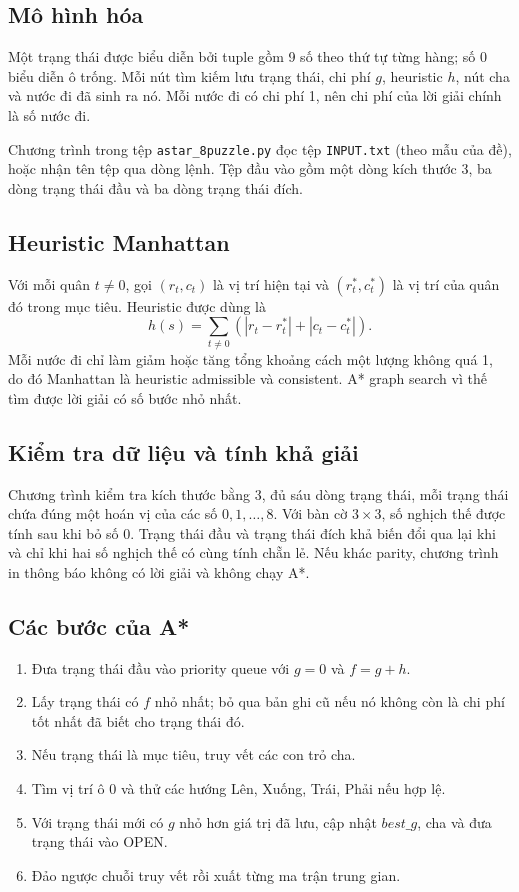 \documentclass[12pt,a4paper]{article}
\begin{document}
\subsection{Mô hình hóa}

Một trạng thái được biểu diễn bởi tuple gồm 9 số theo thứ tự từng hàng;
số $0$ biểu diễn ô trống. Mỗi nút tìm kiếm lưu trạng thái, chi phí $g$,
heuristic $h$, nút cha và nước đi đã sinh ra nó. Mỗi nước đi có chi phí
1, nên chi phí của lời giải chính là số nước đi.

Chương trình trong tệp \texttt{astar\_8puzzle.py} đọc tệp \texttt{INPUT.txt}
(theo mẫu của đề), hoặc nhận tên tệp qua dòng lệnh. Tệp đầu vào gồm một
dòng kích thước 3, ba dòng trạng thái đầu và ba dòng trạng thái đích.

\subsection{Heuristic Manhattan}

Với mỗi quân $t\ne0$, gọi $(r_t,c_t)$ là vị trí hiện tại và
$(r_t^*,c_t^*)$ là vị trí của quân đó trong mục tiêu. Heuristic được dùng
là
\[
 h(s)=\sum_{t\ne0}\left(|r_t-r_t^*|+|c_t-c_t^*|\right).
\]
Mỗi nước đi chỉ làm giảm hoặc tăng tổng khoảng cách một lượng không quá
1, do đó Manhattan là heuristic admissible và consistent. A* graph search
vì thế tìm được lời giải có số bước nhỏ nhất.

\subsection{Kiểm tra dữ liệu và tính khả giải}

Chương trình kiểm tra kích thước bằng 3, đủ sáu dòng trạng thái, mỗi trạng
thái chứa đúng một hoán vị của các số $0,1,\ldots,8$. Với bàn cờ $3\times3$,
số nghịch thế được tính sau khi bỏ số 0. Trạng thái đầu và trạng thái đích
khả biến đổi qua lại khi và chỉ khi hai số nghịch thế có cùng tính chẵn lẻ.
Nếu khác parity, chương trình in thông báo không có lời giải và không chạy
A*.

\subsection{Các bước của A*}

\begin{enumerate}[label=\arabic*.]
    \item Đưa trạng thái đầu vào priority queue với $g=0$ và $f=g+h$.
    \item Lấy trạng thái có $f$ nhỏ nhất; bỏ qua bản ghi cũ nếu nó không còn
    là chi phí tốt nhất đã biết cho trạng thái đó.
    \item Nếu trạng thái là mục tiêu, truy vết các con trỏ cha.
    \item Tìm vị trí ô 0 và thử các hướng Lên, Xuống, Trái, Phải nếu hợp lệ.
    \item Với trạng thái mới có $g$ nhỏ hơn giá trị đã lưu, cập nhật
    $best\_g$, cha và đưa trạng thái vào OPEN.
    \item Đảo ngược chuỗi truy vết rồi xuất từng ma trận trung gian.
\end{enumerate}
\end{document}
